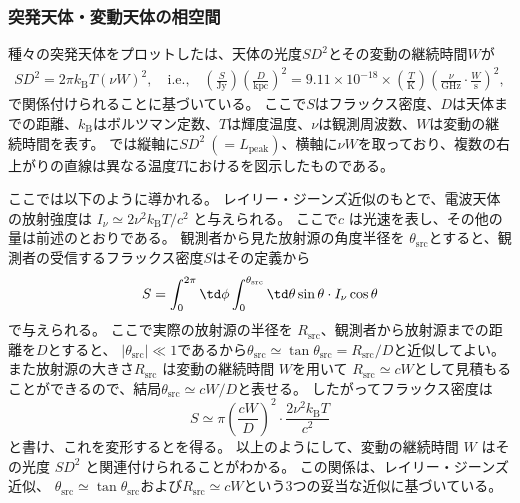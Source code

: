 \subsubsection{突発天体・変動天体の相空間}
種々の突発天体をプロットしたは、天体の光度$SD^2$とその変動の継続時間$W$が
\begin{align}
	SD^2 = 2 \pi k_\text{B} T (\nu W)^2, \quad \text{i.e.,} \quad
	\left( \frac{S}{\text{Jy}} \right) \left( \frac{D}{\text{kpc}} \right)^2 = 9.11 \times 10^{-18} \times
		\left( \frac{T}{\text{K}} \right) \left( \frac{\nu}{\text{GHz}} \cdot \frac{W}{\text{s}} \right)^2,
	\label{eq:transients.phasespace}
\end{align}
で関係付けられることに基づいている。
ここで$S$はフラックス密度、$D$は天体までの距離、$k_\text{B}$はボルツマン定数、$T$は輝度温度、$\nu$は観測周波数、$W$は変動の継続時間を表す。
では縦軸に$SD^2~(=L_\text{peak})$、横軸に$\nu W$を取っており、複数の右上がりの直線は異なる温度$T$におけるを図示したものである。

ここでは以下のように導かれる。
レイリー・ジーンズ近似のもとで、電波天体の放射強度は $I_\nu \simeq 2\nu^2 k_\text{B} T / c^2$ と与えられる。
ここで$c$ は光速を表し、その他の量は前述のとおりである。
観測者から見た放射源の角度半径を $\theta_\text{src}$とすると、観測者の受信するフラックス密度$S$はその定義から
\begin{equation}
	S = \int_0^{2\pi} \td \phi \int_0^{\theta_\text{src}} \td \theta \sin \theta \cdot I_\nu \cos \theta
\end{equation}
で与えられる。
ここで実際の放射源の半径を $R_\text{src}$、観測者から放射源までの距離を$D$とすると、 $|\theta_\text{src}| \ll 1$であるから$\theta_\text{src} \simeq \tan \theta_\text{src} = R_\text{src} / D$と近似してよい。
また放射源の大きさ$R_\text{src}$ は変動の継続時間 $W$を用いて $R_\text{src} \simeq c W$として見積もることができるので、結局$\theta_\text{src} \simeq cW/D$と表せる。
したがってフラックス密度は
\begin{equation}
	S \simeq \pi \left( \frac{cW}{D} \right)^2 \cdot \frac{2\nu^2 k_\text{B} T}{c^2}
\end{equation}
と書け、これを変形するとを得る。
以上のようにして、変動の継続時間 $W$ はその光度 $SD^2$ と関連付けられることがわかる。
この関係は、レイリー・ジーンズ近似、 $\theta_\text{src} \simeq \tan \theta_\text{src}$および$R_\text{src} \simeq c W$という3つの妥当な近似に基づいている。

